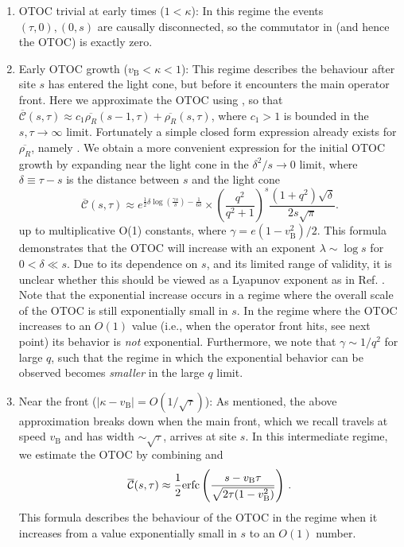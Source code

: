 \documentclass[aps,prb,twocolumn,superscriptaddress]{revtex4-1}
\begin{document}
\begin{enumerate}

\item OTOC trivial at early times ($1< \kappa$): In this regime the events $(\tau,0), (0,s)$ are causally disconnected, so the commutator in  (and hence the OTOC) is exactly zero. 

\item Early OTOC growth ($v_{\text{B}} < \kappa <1 $): This regime describes the behaviour after site $s$ has entered the light cone, but before it encounters the main operator front. Here we approximate the OTOC using , so that $\overline{\mathcal{C}}(s,\tau) \approx c_1 \overline{\rho_{R}}(s-1,\tau)+\overline{\rho_{R}}(s,\tau)$, where $c_1>1$ is bounded in the $s,\tau\rightarrow \infty$ limit. Fortunately a simple closed form expression already exists for $\overline{\rho_{R}}$, namely . We obtain a more convenient expression for the initial OTOC growth by expanding  near the light cone in the $\delta^2 /s \rightarrow 0$ limit, where $\delta\equiv \tau-s$  is the distance between $s$ and the light cone
\begin{equation}\label{eq:lyaponov}
\overline{\mathcal{C}}(s,\tau) \approx   e^{\frac{1}{2} \delta  \log (\frac{\gamma s }{\delta })-\frac{1}{6 \delta }} \times \left(\frac{q^2}{q^2+1}\right)^s  \frac{(1+q^2)\sqrt{\delta}} {2s\sqrt{\pi   }} .
\end{equation}
up to multiplicative O(1) constants, where $\gamma=e\left(1-v_{\text{B}}^{2}\right)/2$. This formula demonstrates that the OTOC will increase with an exponent $\lambda \sim \log  s$ for $0<\delta \ll s$. Due to its dependence on $s$, and its limited range of validity, it is unclear whether this should be viewed as a Lyapunov exponent as in Ref. . Note that the exponential increase occurs in a regime where the overall scale of the OTOC is still exponentially small in $s$. In the regime where the OTOC increases to an $O(1)$ value (i.e., when the operator front hits, see next point) its behavior is \emph{not} exponential. Furthermore, we note that $\gamma\sim 1/q^{2}$ for large $q$, such that the regime in which the exponential behavior can be observed becomes \emph{smaller} in the large $q$ limit.

\item Near the front ($ |\kappa -  v_{\text{B}}| =  O(1/\sqrt{\tau})$): As mentioned, the above approximation breaks down when the main front, which we recall travels at speed $v_{\text{B}}$ and has width $\sim \sqrt{\tau}$, arrives at site $s$. In this intermediate regime, we estimate the OTOC by combining  and 
\begin{equation}\label{eq:otoc_intermediate}
\overline{\mathcal{C}}(s,\tau) \approx\frac{1}{2} \text{erfc}\left(\frac{s-v_{\text{B}}\tau}{\sqrt{2\tau(1-v_{\text{B}}^{2})}}\right)\,.
\end{equation}
This formula describes the behaviour of the OTOC in the regime when it increases from a value exponentially small in $s$ to an $O(1)$ number.


\end{enumerate}
\end{document}
